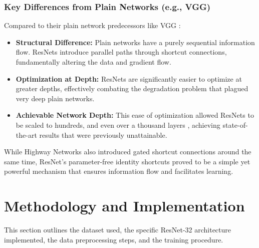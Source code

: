 \documentclass[11pt, a4paper]{article}
\begin{document}
\subsubsection{Key Differences from Plain Networks (e.g., VGG)}
Compared to their plain network predecessors like VGG \cite{Simonyan15}:
\begin{itemize}[itemsep=0.5em]
    \item \textbf{Structural Difference:} Plain networks have a purely sequential information flow. ResNets introduce parallel paths through shortcut connections, fundamentally altering the data and gradient flow.
    \item \textbf{Optimization at Depth:} ResNets are significantly easier to optimize at greater depths, effectively combating the degradation problem that plagued very deep plain networks.
    \item \textbf{Achievable Network Depth:} This ease of optimization allowed ResNets to be scaled to hundreds, and even over a thousand layers \cite{he2015deepresiduallearningimage}, achieving state-of-the-art results that were previously unattainable.
\end{itemize}
While Highway Networks \cite{Srivastava15highway} also introduced gated shortcut connections around the same time, ResNet's parameter-free identity shortcuts proved to be a simple yet powerful mechanism that ensures information flow and facilitates learning.

\clearpage %
\section{Methodology and Implementation}
This section outlines the dataset used, the specific ResNet-32 architecture implemented, the data preprocessing steps, and the training procedure.
\end{document}
